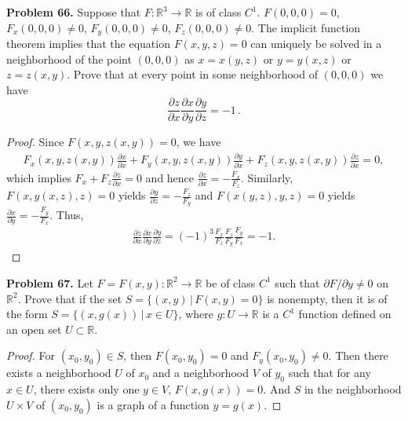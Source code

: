 \documentclass[12pt,leqno]{amsart}
\theoremstyle{definition}
\begin{document}
\noindent
{\bf Problem 66.}
Suppose that $F:\mathbb{R}^3\to\mathbb{R}$ is of class $C^1$.
$F(0,0,0)=0$, $F_x(0,0,0)\neq 0$, $F_y(0,0,0)\neq 0$,
$F_z(0,0,0)\neq 0$. The implicit function theorem implies
that the equation $F(x,y,z)=0$ can uniquely be solved in a
neighborhood of the point $(0,0,0)$
as $x=x(y,z)$ or $y=y(x,z)$ or $z=z(x,y)$. Prove that
at every point in some neighborhood of $(0,0,0)$ we have
$$
\frac{\partial z}{\partial x} \frac{\partial x}{\partial y}
\frac{\partial y}{\partial z}=-1\, .
$$
\begin{proof}
Since $F(x,y,z(x,y)) = 0$, we have
\begin{align*}
    F_x(x,y,z(x,y))\frac{\partial x}{\partial x} + F_y(x,y,z(x,y))\frac{\partial y}{\partial x} + 
    F_z(x,y,z(x,y))\frac{\partial z}{\partial x} = 0,
\end{align*}
which implies $F_x + F_z \frac{\partial z}{\partial x} = 0$ and hence $\frac{\partial z}{\partial x} = - \frac{F_x}{F_z}$. Similarly, $F(x,y(x,z),z) = 0$ yields $\frac{\partial y}{\partial z} = - \frac{F_z}{F_y}$ and $F(x(y,z),y,z) = 0$ yields $\frac{\partial x}{\partial y} = - \frac{F_y}{F_x}$. Thus, 
\begin{align*}
    \frac{\partial z}{\partial x} \frac{\partial x}{\partial y} \frac{\partial y}{\partial z} = (-1)^3 \frac{F_x}{F_z} \frac{F_z}{F_y} \frac{F_y}{F_x} = -1.
\end{align*}
\end{proof}

\medskip


\noindent
{\bf Problem 67.}
Let $F=F(x,y):\mathbb{R}^2\to\mathbb{R}$ be of class $C^1$ such that
$\partial F/\partial y\neq 0$ on $\mathbb{R}^2$.
Prove that if the set
$S=\{ (x,y)\, |\, F(x,y)=0\}$ is nonempty, then it is of the form
$S=\{ (x,g(x))\, |\, x\in U\}$, where $g:U\to\mathbb{R}$ is a $C^1$ function
defined on an open set $U\subset\mathbb{R}$.
\begin{proof}
For $(x_0, y_0) \in S$, then $F(x_0, y_0) = 0$ and $F_y(x_0, y_0) \neq 0$. Then there exists a neighborhood $U$ of $x_0$ and a neighborhood $V$ of $y_0$ such that for any $x\in U$, there exists only one $y\in V$, $F(x, g(x)) = 0$. And $S$ in the neighborhood $U \times V$ of $(x_0, y_0)$ is a graph of a function $y = g(x)$. 
\end{proof}

\medskip
\end{document}
